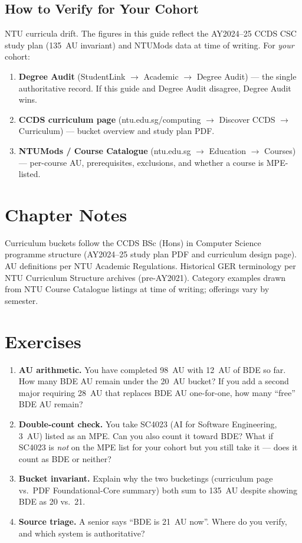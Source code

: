 \subsection{How to Verify for Your Cohort}
NTU curricula drift. The figures in this guide reflect the AY2024--25 CCDS CSC study plan (135~AU invariant) and NTUMods data at time of writing. For \emph{your} cohort:
\begin{enumerate}
    \item \textbf{Degree Audit} (StudentLink $\to$ Academic $\to$ Degree Audit) --- the single authoritative record. If this guide and Degree Audit disagree, Degree Audit wins.
    \item \textbf{CCDS curriculum page} (ntu.edu.sg/computing $\to$ Discover CCDS $\to$ Curriculum) --- bucket overview and study plan PDF.
    \item \textbf{NTUMods / Course Catalogue} (ntu.edu.sg $\to$ Education $\to$ Courses) --- per-course AU, prerequisites, exclusions, and whether a course is MPE-listed.
\end{enumerate}

\section{Chapter Notes}
Curriculum buckets follow the CCDS BSc (Hons) in Computer Science programme structure (AY2024--25 study plan PDF and curriculum design page). AU definitions per NTU Academic Regulations. Historical GER terminology per NTU Curriculum Structure archives (pre-AY2021). Category examples drawn from NTU Course Catalogue listings at time of writing; offerings vary by semester.

\section{Exercises}
\label{sec:ch01-exercises}
\begin{enumerate}[label=E1.\arabic*, leftmargin=*, itemsep=0.8em]
    \item \textbf{AU arithmetic.} You have completed 98~AU with 12~AU of BDE so far. How many BDE AU remain under the 20~AU bucket? If you add a second major requiring 28~AU that replaces BDE AU one-for-one, how many ``free'' BDE AU remain?
    \item \textbf{Double-count check.} You take SC4023 (AI for Software Engineering, 3~AU) listed as an MPE. Can you also count it toward BDE? What if SC4023 is \emph{not} on the MPE list for your cohort but you still take it --- does it count as BDE or neither?
    \item \textbf{Bucket invariant.} Explain why the two bucketings (curriculum page vs.\ PDF Foundational-Core summary) both sum to 135~AU despite showing BDE as 20 vs.\ 21.
    \item \textbf{Source triage.} A senior says ``BDE is 21~AU now''. Where do you verify, and which system is authoritative?
\end{enumerate}
